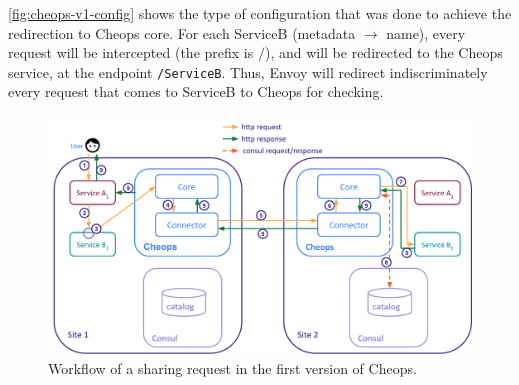 \autoref{fig:cheops-v1-config} shows the type of configuration that
was done to achieve the redirection to Cheops core.
%
For each ServiceB (metadata $\rightarrow$ name), every request will be
intercepted (the prefix is $/$), and will be redirected to the Cheops
service, at the endpoint \verb|/ServiceB|.
%
Thus, Envoy will redirect indiscriminately every request that comes
to ServiceB to Cheops for checking.


\begin{figure}[htbp]
  \centering
  \includegraphics[width=\textwidth]{figs/pdf/cheopsv1}
  \caption{Workflow of a sharing request in the first version of Cheops.}
  \label{fig:cheops-v1}
\end{figure}

